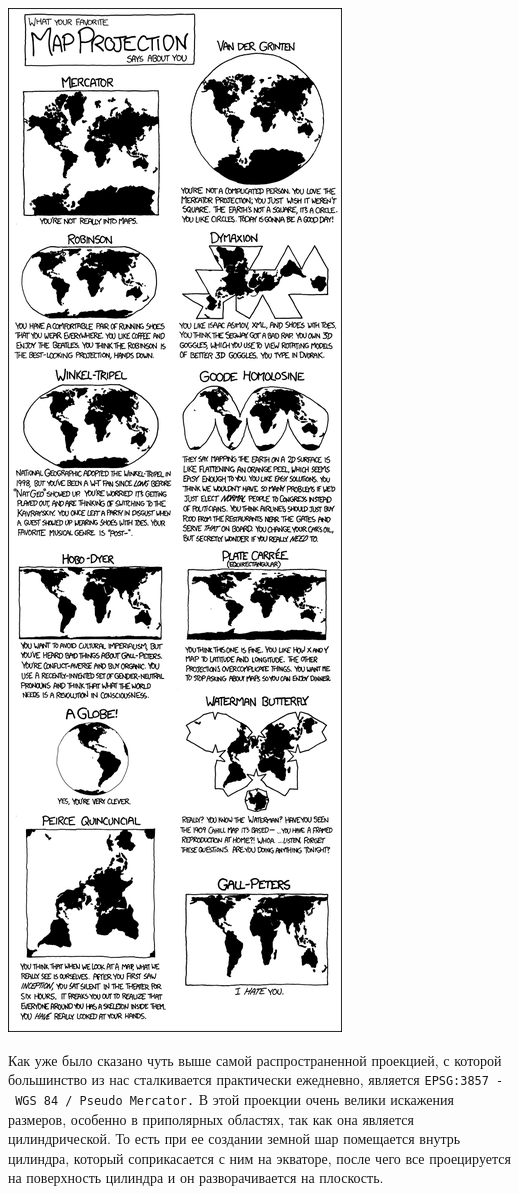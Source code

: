 \documentclass[
]{book}
\begin{document}
\includegraphics{figures/map_projections.png}

Как уже было сказано чуть выше самой распространенной проекцией, с которой большинство из нас сталкивается практически ежедневно, является \texttt{EPSG:3857\ -\ WGS\ 84\ /\ Pseudo\ Mercator.} В этой проекции очень велики искажения размеров, особенно в приполярных областях, так как она является цилиндрической. То есть при ее создании земной шар помещается внутрь цилиндра, который соприкасается с ним на экваторе, после чего все проецируется на поверхность цилиндра и он разворачивается на плоскость.
\end{document}

